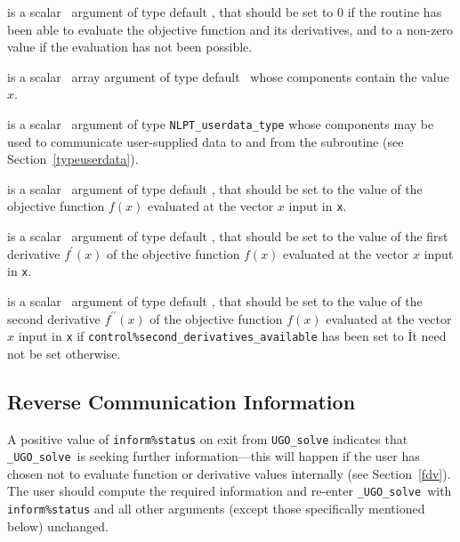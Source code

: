 \documentclass{galahad}
\newcommand{\packagename}{UGO}
\newcommand{\fullpackagename}{\libraryname\_\packagename}
\newcommand{\solver}{{\tt \fullpackagename\_solve}}
\begin{document}
\begin{description}
 is a scalar \intentout\ argument of type default \integer,
that should be set to 0 if the routine has been able to evaluate
the objective function and its derivatives,
and to a non-zero value if the evaluation has not been possible.

 is a scalar \intentin\ array argument of type default \realdp\
whose components contain the value $x$.

 is a scalar \intentinout\ argument of type
{\tt NLPT\_userdata\_type} whose components may be used
to communicate user-supplied data to and from the
subroutine (see Section~\ref{typeuserdata}).

 is a scalar \intentout\ argument of type default \realdp,
that should be set to the value of the objective function $f(x)$
evaluated at the vector $x$ input in {\tt x}.

 is a scalar \intentout\ argument of type default \realdp,
that should be set to the value of the first derivative
$f^{\prime}(x)$ of the objective function $f(x)$
evaluated at the vector $x$ input in {\tt x}.

 is a scalar \intentout\ argument of type default \realdp,
that should be set to the value of the second derivative
$f^{\prime\prime}(x)$ of the objective function $f(x)$
evaluated at the vector $x$ input in {\tt x} if
{\tt control\%second\_derivatives\_available} has been set to \true\.
It need not be set otherwise.

\end{description}


\subsection{\label{reverse}Reverse Communication Information}

A positive value of {\tt inform\%status} on exit from
{\tt \packagename\_solve}
indicates that
\solver\ is seeking further information---this will happen
if the user has chosen not to evaluate function or
derivative values internally (see Section~\ref{fdv}).
The user should compute the required information and re-enter \solver\
with {\tt inform\%status} and all other arguments (except those specifically
mentioned below) unchanged.
\end{document}
